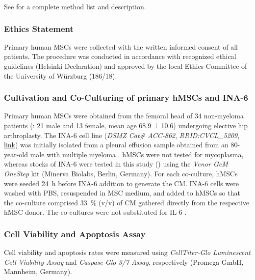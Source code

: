 %
\label{C1:methods}%
See  for a complete method list and description.


\subsubsection*{Ethics Statement}%
\label{C1:methods_ethics}%
Primary human MSCs were collected with the written informed consent of all
patients. The procedure was conducted in accordance with recognized ethical
guidelines (Helsinki Declaration) and approved by the local Ethics Committee of
the University of Würzburg (186/18).



\subsubsection*{Cultivation and Co-Culturing of primary hMSCs and INA-6}%
\label{C1:methods_cultivation}%
Primary human MSCs were obtained from the femoral head of 34 non-myeloma
patients (: 21 male and 13 female, mean age
68.9 ± 10.6) undergoing elective hip arthroplasty. The INA-6 cell line
(\textit{DSMZ Cat\# ACC-862}, \textit{RRID:CVCL\_5209},
\href{https://www.cellosaurus.org/CVCL_5209}{link}) was initially isolated from
a pleural effusion sample obtained from an 80-year-old male with multiple
myeloma \cite{burgerGp130RasMediated2001c,gramatzkiTwoNewInterleukin61994}.
hMSCs were not tested for mycoplasma, whereas stocks of INA-6 were tested in
this study () using the \textit{Venor GeM
    OneStep} kit (Minerva Biolabs, Berlin, Germany). For each co-culture, hMSCs were
seeded \SI{24}{\hour} before INA-6 addition to generate the \ac{CM}. INA-6 cells
were washed with PBS, resuspended in MSC medium, and added to hMSCs so that the
co-culture comprised \SI{33}{\percent} (v/v) of CM gathered directly from the
respective hMSC donor. The co-cultures were not substituted for IL-6
\cite{chatterjeePresenceBoneMarrow2002}.




\subsubsection*{Cell Viability and Apoptosis Assay}%
\label{C1:methods_cellviability}%
Cell viability and apoptosis rates were measured using \textit{CellTiter-Glo Luminescent
    Cell Viability Assay} and \textit{Caspase-Glo 3/7 Assay}, respectively (Promega GmbH,
Mannheim, Germany).


